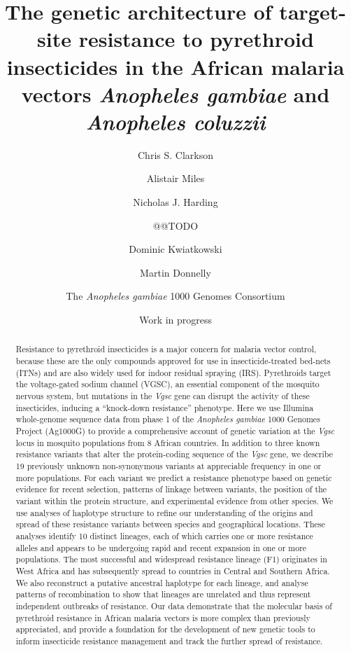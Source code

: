 \documentclass[a4paper,11pt,abstracton]{scrartcl}
\title{
The genetic architecture of target-site resistance to pyrethroid insecticides in the African malaria vectors \emph{Anopheles gambiae} and \emph{Anopheles coluzzii}
}
\date{Work in progress}
\author[1]{Chris S. Clarkson}
\author[2,1]{Alistair Miles}
\author[2]{Nicholas J. Harding}
\author{@@TODO}
\author[1,2]{Dominic Kwiatkowski}
\author[3,1]{Martin Donnelly}
\author[4]{The \emph{Anopheles gambiae} 1000 Genomes Consortium}
\affil[1]{Sanger @@TODO}
\affil[2]{Oxford @@TODO}
\affil[3]{Liverpool @@TODO}
\affil[4]{MalariaGEN @@TODO}
\begin{document}
\maketitle


\begin{abstract}


Resistance to pyrethroid insecticides is a major concern for malaria vector control, because these are the only compounds approved for use in insecticide-treated bed-nets (ITNs) and are also widely used for indoor residual spraying (IRS). 
%
Pyrethroids target the voltage-gated sodium channel (VGSC), an essential component of the mosquito nervous system, but mutations in the \emph{Vgsc} gene can disrupt the activity of these insecticides, inducing a ``knock-down resistance'' phenotype. 
%
Here we use Illumina whole-genome sequence data from phase 1 of the \emph{Anopheles gambiae} 1000 Genomes Project (Ag1000G) to provide a comprehensive account of genetic variation at the \emph{Vgsc} locus in mosquito populations from 8 African countries.
%
In addition to three known resistance variants that alter the protein-coding sequence of the \emph{Vgsc} gene, we describe 19 previously unknown non-synonymous variants at appreciable frequency in one or more populations.
%
For each variant we predict a resistance phenotype based on genetic evidence for recent selection, patterns of linkage between variants, the position of the variant within the protein structure, and experimental evidence from other species.
%
We use analyses of haplotype structure to refine our understanding of the origins and spread of these resistance variants between species and geographical locations.
%
These analyses identify 10 distinct lineages, each of which carries one or more resistance alleles and appears to be undergoing rapid and recent expansion in one or more populations.
%
The most successful and widespread resistance lineage (F1) originates in West Africa and has subsequently spread to countries in Central and Southern Africa.
%
We also reconstruct a putative ancestral haplotype for each lineage, and analyse patterns of recombination to show that lineages are unrelated and thus represent independent outbreaks of resistance.
%
Our data demonstrate that the molecular basis of pyrethroid resistance in African malaria vectors is more complex than previously appreciated, and provide a foundation for the development of new genetic tools to inform insecticide resistance management and track the further spread of resistance.

\end{abstract}
\end{document}
